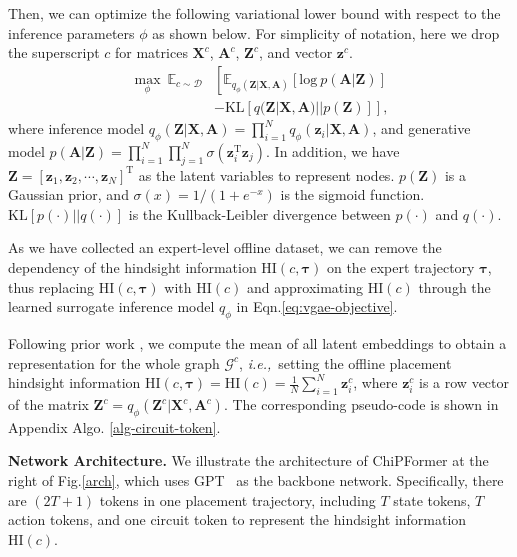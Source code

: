 \documentclass{article}
\newcommand{\ie}{\textit{i.e.,}~}
\newcommand{\bc}{{c}}
\newcommand{\btau}{\bm{\tau}}
\theoremstyle{plain}
\theoremstyle{definition}
\theoremstyle{remark}
\begin{document}
Then, we can optimize the following variational lower bound with respect to the inference parameters $\phi$ as shown below. For simplicity of notation, here we drop the superscript $\bc$ for matrices $\textbf{X}^\bc$, $\textbf{A}^\bc$, $\textbf{Z}^\bc$, and vector $\bm{z}^\bc$.
\begin{align}
\max_{\phi} \ \mathbb{E}_{\bc\sim\mathcal{D}} &\left[\mathbb{E}_{q_\phi(\bm{Z}|\bm{X}, \bm{A})}[\text{log}\ p(\bm{A}|\bm{Z})] \right. \nonumber\\
&\left. - \text{KL}[q(\bm{Z}|\bm{X},\bm{A})||p(\bm{Z})] \right], \label{eq:vgae-objective}
\end{align}
where inference model $q_\phi(\bm{Z}|\bm{X}, \bm{A}) = \prod_{i=1}^{N} q_\phi(\bm{z}_i|\bm{X},\bm{A})$, and generative model $p(\bm{A}|\bm{Z}) = \prod_{i=1}^N\prod_{j=1}^N\sigma(\bm{z}_i^\text{T}\bm{z}_j)$. In addition, we have $\bm{Z} = [\bm{z}_1, \bm{z}_2, \cdots, \bm{z}_N]^\text{T}$
as the latent variables to represent nodes. $p(\bm{Z})$ is a Gaussian prior, and $\sigma(x) = 1/(1+e^{-x})$ is the sigmoid function. $\text{KL}[p(\cdot)||q(\cdot)]$ is the Kullback-Leibler divergence  between $p(\cdot)$ and $q(\cdot)$.

As we have collected an expert-level offline dataset, we can remove the dependency of the hindsight information $\text{HI}(\bc,\btau)$ on the expert trajectory $\btau$, thus replacing $\text{HI}(\bc,\btau)$ with $\text{HI}(\bc)$ and approximating $\text{HI}(\bc)$ through the learned surrogate inference model ${q_\phi}$ in Eqn.\eqref{eq:vgae-objective}. 

Following prior work \cite{mirhoseini2021graph}, we compute the mean of all latent embeddings 
to obtain a representation for the whole graph $\mathcal{G}^\bc$, \ie setting the offline placement hindsight information $\text{HI}(c,\btau) = \text{HI}(c) = \frac{1}{N}\sum_{i=1}^{N}\bm{z}_i^\bc$, 
where $\bm{z}_i^\bc$ is a row vector of the matrix $\bm{Z}^\bc = q_\phi(\bm{Z}^\bc|\bm{X}^\bc, \bm{A}^\bc)$. The corresponding pseudo-code is shown in Appendix Algo. \ref{alg-circuit-token}.


\textbf{Network Architecture.} 
We illustrate the architecture of  ChiPFormer  at the right of Fig.\ref{arch}, which uses GPT~\citep{radford2018improving, radford2019language} as the backbone network. 
Specifically, there are $(2T+1)$ tokens in one placement trajectory, including $T$ state tokens, $T$ action tokens, and one circuit token to represent the hindsight information $\text{HI}(\bc)$. 
\end{document}
